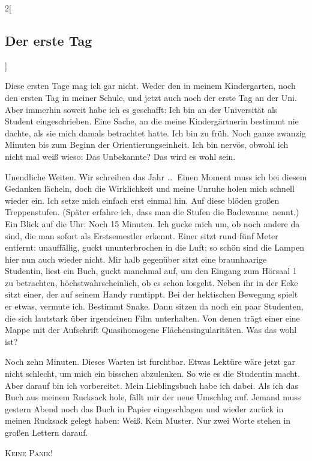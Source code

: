 \begin{multicols}{2}[\subsection{Der erste Tag}]

Diese ersten Tage mag ich gar nicht. Weder den in meinem Kindergarten, noch den
ersten Tag in meiner Schule, und jetzt auch noch der erste Tag an der Uni. Aber
immerhin soweit habe ich es geschafft: Ich bin an der Universität als Student
eingeschrieben. Eine Sache, an die meine Kindergärtnerin bestimmt nie dachte,
als sie mich damals betrachtet hatte. Ich bin zu früh. Noch ganze zwanzig
Minuten bis zum Beginn der Orientierungseinheit. Ich bin nervös, obwohl ich
nicht mal weiß wieso: Das Unbekannte? Das wird es wohl sein.

Unendliche Weiten. Wir schreiben das Jahr \thisYear \dots\ Einen Moment muss
ich bei diesem Gedanken lächeln, doch die Wirklichkeit und meine Unruhe holen
mich schnell wieder ein.  Ich setze mich einfach erst einmal hin.  Auf diese
blöden großen Treppenstufen. (Später erfahre ich, dass man die Stufen \glqq die
Badewanne\grqq\ nennt.) Ein Blick auf die Uhr: Noch 15 Minuten. Ich gucke mich
um, ob noch andere da sind, die man sofort als Erstsemestler erkennt. Einer
sitzt rund fünf Meter entfernt: unauffällig, guckt ununterbrochen in die Luft;
so schön sind die Lampen hier nun auch wieder nicht. Mir halb gegenüber sitzt
eine braunhaarige Studentin, liest ein Buch, guckt manchmal auf, um den Eingang
zum Hörsaal 1 zu betrachten, höchstwahrscheinlich, ob es schon losgeht. Neben
ihr in der Ecke sitzt einer, der auf seinem Handy rumtippt. Bei der hektischen
Bewegung spielt er etwas, vermute ich.  Bestimmt Snake. Dann sitzen da noch ein
paar Studenten, die sich lautstark über irgendeinen Film unterhalten. Von denen
trägt einer eine Mappe mit der Aufschrift \glqq Quasihomogene
Flächensingularitäten\grqq. Was das wohl ist?

Noch zehn Minuten. Dieses Warten ist furchtbar. Etwas Lektüre wäre jetzt gar
nicht schlecht, um mich ein bisschen abzulenken. So wie es die Studentin macht.
Aber darauf bin ich vorbereitet. Mein Lieblingsbuch habe ich dabei. Als ich das
Buch aus meinem Rucksack hole, fällt mir der neue Umschlag auf. Jemand muss
gestern Abend noch das Buch in Papier eingeschlagen und wieder zurück in meinen
Rucksack gelegt haben: Weiß. Kein Muster. Nur zwei Worte stehen in großen
Lettern darauf.

\begin{center}
\scshape{Keine Panik!}
\end{center}


\end{multicols}
